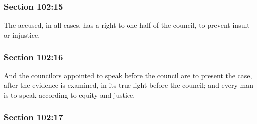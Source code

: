 
	\subsubsection{Section 102:15} %
		\label{DC102-15}

		The accused, in all cases, has a right to one-half of the council, to prevent insult or injustice.


	\subsubsection{Section 102:16} %
		\label{DC102-16}

		And the councilors appointed to speak before the council are to present the case, after the evidence is examined, in its true light before the council; and every man is to speak according to equity and justice.


	\subsubsection{Section 102:17} %
		\label{DC102-17}

